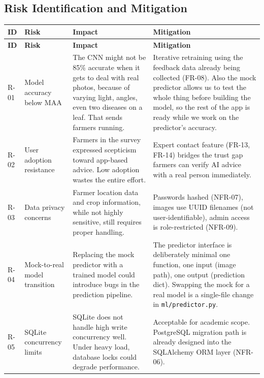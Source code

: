 \documentclass[12pt,a4paper]{article}
\begin{document}
\subsection{Risk Identification and Mitigation}

\begin{longtable}{|p{1cm}|p{2.8cm}|p{4.5cm}|p{5cm}|}
\hline
\rowcolor{lightgreen}
\textbf{ID} & \textbf{Risk} & \textbf{Impact} & \textbf{Mitigation} \\
\hline
\endfirsthead
\hline
\rowcolor{lightgreen}
\textbf{ID} & \textbf{Risk} & \textbf{Impact} & \textbf{Mitigation} \\
\hline
\endhead

R-01 & Model accuracy below MAA &
The CNN might not be 85\% accurate when it gets to deal with real photos, because of varying light, angles, even two diseases on a leaf. That sends farmers running. &
Iterative retraining using the feedback data already being collected (FR-08). Also the mock predictor allows us to test the whole thing before building the model, so the rest of the app is ready while we work on the predictor's accuracy. \\
\hline

R-02 & User adoption resistance &
Farmers in the survey expressed scepticism toward app-based advice. Low adoption wastes the entire effort. &
Expert contact feature (FR-13, FR-14) bridges the trust gap farmers can verify AI advice with a real person immediately. \\
\hline

R-03 & Data privacy concerns &
Farmer location data and crop information, while not highly sensitive, still requires proper handling. &
Passwords hashed (NFR-07), images use UUID filenames (not user-identifiable), admin access is role-restricted (NFR-09). \\
\hline

R-04 & Mock-to-real model transition &
Replacing the mock predictor with a trained model could introduce bugs in the prediction pipeline. &
The predictor interface is deliberately minimal one function, one input (image path), one output (prediction dict). Swapping the mock for a real model is a single-file change in \texttt{ml/predictor.py}. \\
\hline

R-05 & SQLite concurrency limits &
SQLite does not handle high write concurrency well. Under heavy load, database locks could degrade performance. &
Acceptable for academic scope. PostgreSQL migration path is already designed into the SQLAlchemy ORM layer (NFR-06). \\
\hline

\end{longtable}
\end{document}
